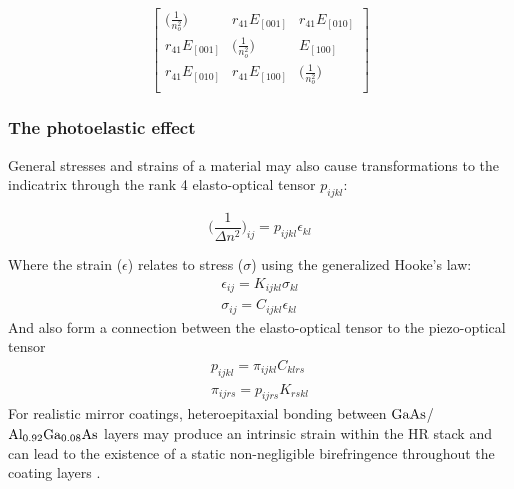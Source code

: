 \begin{equation}
 \left[ {\begin{array}{ccc}
   \big( \frac{1}{n_o ^2} \big)& r_{41}E_{[001]} & r_{41} E_{[010]}\\
   r_{41}E_{[001]} & \big( \frac{1}{n_o ^2} \big) &  E_{[100]}\\
   r_{41} E_{[010]} & r_{41} E_{[100]} & \big( \frac{1}{n_o ^2} \big)\\
  \end{array}} \right]
\end{equation}

\subsubsection{The photoelastic effect}

General stresses and strains of a material may also cause transformations to the indicatrix through the rank 4 elasto-optical tensor $p_{i j k l}$:

\begin{equation}
 \bigg( \frac{1}{\Delta n^2} \bigg)_{ij} = p_{ijkl} \epsilon_{kl}
\end{equation}

\noindent Where the strain ({\boldmath$\epsilon$}) relates to stress ({\boldmath$\sigma$}) using the generalized Hooke's law: 
\begin{equation}\label{eq:genhookeslaw} 
 \begin{split}
	 \epsilon_{ij} = K_{ijkl} \sigma_{kl}
	 \\
	 \sigma_{ij} = C_{ijkl} \epsilon_{kl}
 \end{split}
\end{equation}
And also form a connection between the elasto-optical tensor to the piezo-optical tensor
\begin{equation}\label{eq:indicgenelastooptical}
 \begin{split}
	p_{ijkl} = \pi_{ijkl} C_{klrs}
	\\
	\pi_{ijrs} = p_{ijrs} K_{rskl}
 \end{split}
\end{equation}
For realistic mirror coatings, heteroepitaxial bonding between $\mathrm{GaAs}$/$\mathrm{Al_{0.92}Ga_{0.08}As}$ layers may produce an intrinsic strain within the HR stack and can lead to the existence of a static non-negligible birefringence throughout the coating layers \cite{cole:2016}.

